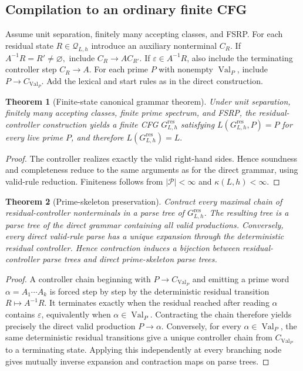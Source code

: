 \documentclass[11pt,a4paper]{article}
\newtheorem{theorem}{Theorem}[section]
\newcommand{\eps}{\varepsilon}
\newcommand{\Pcal}{\mathcal P}
\newcommand{\Qcal}{\mathcal Q}
\newcommand{\Val}{\operatorname{Val}}
\begin{document}
\subsection{Compilation to an ordinary finite CFG}

Assume unit separation, finitely many accepting classes, and FSRP.  For each residual state $R\in\Qcal_{L,h}$ introduce an auxiliary nonterminal $C_R$.  If
\(A^{-1}R=R'\neq\varnothing,\)
include
\(C_R\to A C_{R'}.\)
If $\eps\in A^{-1}R$, also include the terminating controller step
\(C_R\to A.\)
For each prime $P$ with nonempty $\Val_P$, include
\(P\to C_{\Val_P}.\)
Add the lexical and start rules as in the direct construction.

\begin{theorem}[Finite-state canonical grammar theorem]
Under unit separation, finitely many accepting classes, finite prime spectrum, and FSRP, the residual-controller construction yields a finite CFG $G^{\mathrm{res}}_{L,h}$ satisfying
\(L(G^{\mathrm{res}}_{L,h},P)=P\)
for every live prime $P$, and therefore
\(L(G^{\mathrm{res}}_{L,h})=L.\)
\end{theorem}

\begin{proof}
The controller realizes exactly the valid right-hand sides.  Hence soundness and completeness reduce to the same arguments as for the direct grammar, using valid-rule reduction.  Finiteness follows from $|\Pcal|<\infty$ and $\kappa(L,h)<\infty$.
\end{proof}

\begin{theorem}[Prime-skeleton preservation]
\label{thm:prime-skeleton-preservation}
Contract every maximal chain of residual-controller nonterminals in a parse tree of $G^{\mathrm{res}}_{L,h}$.  The resulting tree is a parse tree of the direct grammar containing all valid productions.  Conversely, every direct valid-rule parse has a unique expansion through the deterministic residual controller.  Hence contraction induces a bijection between residual-controller parse trees and direct prime-skeleton parse trees.
\end{theorem}

\begin{proof}
A controller chain beginning with $P\to C_{\Val_P}$ and emitting a prime word $\alpha=A_1\cdots A_k$ is forced step by step by the deterministic residual transition $R\mapsto A^{-1}R$.  It terminates exactly when the residual reached after reading $\alpha$ contains $\eps$, equivalently when $\alpha\in\Val_P$.  Contracting the chain therefore yields precisely the direct valid production $P\to\alpha$.  Conversely, for every $\alpha\in\Val_P$, the same deterministic residual transitions give a unique controller chain from $C_{\Val_P}$ to a terminating state.  Applying this independently at every branching node gives mutually inverse expansion and contraction maps on parse trees.
\end{proof}
\end{document}
